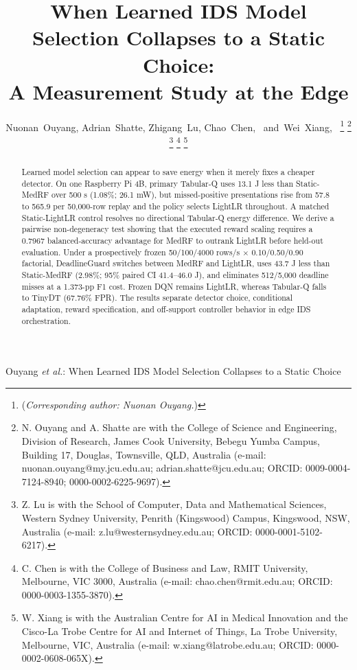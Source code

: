 \documentclass[journal]{IEEEtran}
\begin{document}
\title{When Learned IDS Model Selection Collapses to a Static Choice:\\A Measurement Study at the Edge}
\author{Nuonan~Ouyang,
        Adrian~Shatte,
        Zhigang~Lu,
        Chao~Chen,~
        and~Wei~Xiang,~%
\thanks{(\textit{Corresponding author: Nuonan Ouyang.})}%
\thanks{N. Ouyang and A. Shatte are with the College of Science and Engineering, Division of Research, James Cook University, Bebegu Yumba Campus, Building 17, Douglas, Townsville, QLD, Australia (e-mail: nuonan.ouyang@my.jcu.edu.au; adrian.shatte@jcu.edu.au; ORCID: 0009-0004-7124-8940; 0000-0002-6225-9697).}%
\thanks{Z. Lu is with the School of Computer, Data and Mathematical Sciences, Western Sydney University, Penrith (Kingswood) Campus, Kingswood, NSW, Australia (e-mail: z.lu@westernsydney.edu.au; ORCID: 0000-0001-5102-6217).}%
\thanks{C. Chen is with the College of Business and Law, RMIT University, Melbourne, VIC 3000, Australia (e-mail: chao.chen@rmit.edu.au; ORCID: 0000-0003-1355-3870).}%
\thanks{W. Xiang is with the Australian Centre for AI in Medical Innovation and the Cisco-La Trobe Centre for AI and Internet of Things, La Trobe University, Melbourne, VIC, Australia (e-mail: w.xiang@latrobe.edu.au; ORCID: 0000-0002-0608-065X).}%
}
%
{Ouyang \MakeLowercase{\textit{et al.}}: When Learned IDS Model Selection Collapses to a Static Choice}
\maketitle
\begin{abstract}
Learned model selection can appear to save energy when it merely fixes a cheaper detector. On one Raspberry Pi 4B, primary Tabular-Q uses 13.1 J less than Static-MedRF over 500 s (1.08\%; 26.1 mW), but missed-positive presentations rise from 57.8 to 565.9 per 50,000-row replay and the policy selects LightLR throughout. A matched Static-LightLR control resolves no directional Tabular-Q energy difference. We derive a pairwise non-degeneracy test showing that the executed reward scaling requires a 0.7967 balanced-accuracy advantage for MedRF to outrank LightLR before held-out evaluation. Under a prospectively frozen 50/100/4000 rows/s $\times$ 0.10/0.50/0.90 factorial, DeadlineGuard switches between MedRF and LightLR, uses 43.7 J less than Static-MedRF (2.98\%; 95\% paired CI 41.4--46.0 J), and eliminates 512/5,000 deadline misses at a 1.373-pp F1 cost. Frozen DQN remains LightLR, whereas Tabular-Q falls to TinyDT (67.76\% FPR). The results separate detector choice, conditional adaptation, reward specification, and off-support controller behavior in edge IDS orchestration.
\end{abstract}
\end{document}
